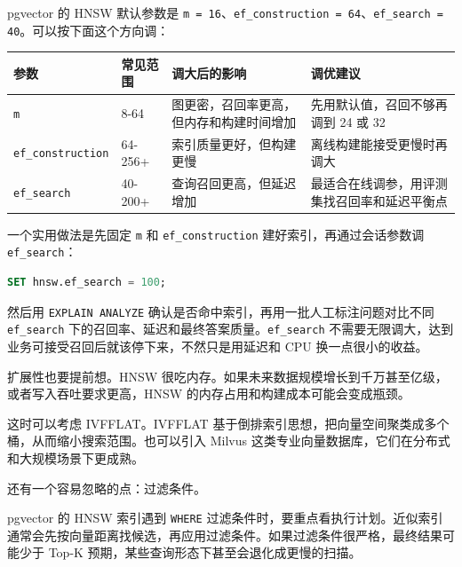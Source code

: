 \documentclass[10pt,a4paper]{ctexart}
\begin{document}
pgvector 的 HNSW 默认参数是 \texttt{m = 16}、\texttt{ef\_construction = 64}、\texttt{ef\_search = 40}。可以按下面这个方向调：


{\footnotesize
\begin{tabularx}{\textwidth}{|X|X|X|X|}
\hline
\textbf{参数} & \textbf{常见范围} & \textbf{调大后的影响} & \textbf{调优建议} \\
\hline
\texttt{m} & 8-64 & 图更密，召回率更高，但内存和构建时间增加 & 先用默认值，召回不够再调到 24 或 32 \\
\hline
\texttt{ef\_construction} & 64-256+ & 索引质量更好，但构建更慢 & 离线构建能接受更慢时再调大 \\
\hline
\texttt{ef\_search} & 40-200+ & 查询召回更高，但延迟增加 & 最适合在线调参，用评测集找召回率和延迟平衡点 \\
\hline
\end{tabularx}
}



一个实用做法是先固定 \texttt{m} 和 \texttt{ef\_construction} 建好索引，再通过会话参数调 \texttt{ef\_search}：



\begin{lstlisting}[language=SQL]
SET hnsw.ef_search = 100;
\end{lstlisting}



然后用 \texttt{EXPLAIN ANALYZE} 确认是否命中索引，再用一批人工标注问题对比不同 \texttt{ef\_search} 下的召回率、延迟和最终答案质量。\texttt{ef\_search} 不需要无限调大，达到业务可接受召回后就该停下来，不然只是用延迟和 CPU 换一点很小的收益。



扩展性也要提前想。HNSW 很吃内存。如果未来数据规模增长到千万甚至亿级，或者写入吞吐要求更高，HNSW 的内存占用和构建成本可能会变成瓶颈。



这时可以考虑 IVFFLAT。IVFFLAT 基于倒排索引思想，把向量空间聚类成多个桶，从而缩小搜索范围。也可以引入 Milvus 这类专业向量数据库，它们在分布式和大规模场景下更成熟。



还有一个容易忽略的点：过滤条件。



pgvector 的 HNSW 索引遇到 \texttt{WHERE} 过滤条件时，要重点看执行计划。近似索引通常会先按向量距离找候选，再应用过滤条件。如果过滤条件很严格，最终结果可能少于 Top-K 预期，某些查询形态下甚至会退化成更慢的扫描。
\end{document}
